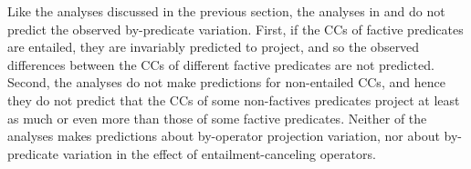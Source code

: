\documentclass[a4paper,12pt,twoside]{article}
\begin{document}




Like the analyses discussed in the previous section, the analyses in \citealt{abrusan_predicting_2011} and \citealt{simons_best_2017} do not predict the observed by-predicate variation. First, if the CCs of factive predicates are entailed, they are invariably predicted to project, and so the observed differences between the CCs of different factive predicates are not predicted.  Second, the analyses do not make predictions for non-entailed CCs, and hence they do not predict that the CCs of some non-factives predicates project at least as much or even more than those of some factive predicates. Neither of the analyses makes predictions about by-operator projection variation, nor about by-predicate variation in the effect of entailment-canceling operators.
  
\end{document}
